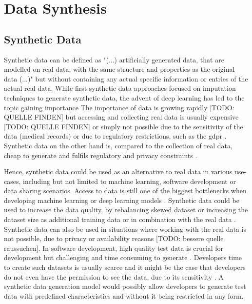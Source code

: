 \section{Data Synthesis}
\label{ch:preliminaries-dataSynthesis}

\subsection{Synthetic Data}
\label{ch:preliminaries-dataSynthesis-syntheticData}
Synthetic data can be defined as "(...) artificially generated data, that are modelled on real data, with the same structure and properties as the original data (...)" \cite[p. 2]{kaloskampis2020SyntheticDataCivil} 
but without containing any actual specific information or entries of the actual real data. 
While first synthetic data approaches \cite{gelman1992InferenceIterativeSimulation} focused on imputation techniques to generate synthetic data, the advent of deep learning has led to the topic gaining importance \cite{kowalczyk2022TaxonomyUseSynthetic, kaloskampis2020SyntheticDataCivil}
The importance of data is growing rapidly [TODO: QUELLE FINDEN] but accessing and collecting real data is usually expensive [TODO: QUELLE FINDEN] or simply not possible due to the sensitivity of the data (\eg medical records) \cite{esteban2017RealvaluedMedicalTimea} or due to regulatory restrictions, such as the \gls{gdpr} \cite{european_commission_regulation_2016}.
Synthetic data on the other hand is, compared to the collection of real data, cheap to generate \cite{leminh2021AirGenGANbasedSynthetica} and fulfils regulatory and privacy constraints \cite{zhao2022CTABGANEnhancingTabular}.

Hence, synthetic data could be used as an alternative to real data in various use-cases,
including but not limited to machine learning, software development or data sharing scenarios.
Access to data is still one of the biggest bottlenecks when developing machine learning or deep learning \glspl{model} \cite{fan2020RelationalDataSynthesisa}.
Synthetic data could be used to increase the data quality, by rebalancing skewed dataset \cite{zhao2022CTABGANEnhancingTabular} 
or increasing the dataset size as additional training data or in combination with the real data \cite{leminh2021AirGenGANbasedSynthetica, kim2021OCTGANNeuralODEbased}.
Synthetic data can also be used in situations where working with the real data is not possible, due to privacy or availability reasons [TODO: bessere quelle raussuchen]\cite{zhao2022CTABGANEnhancingTabular}.
In software development, high quality test data is crucial for development but challenging and time consuming to generate \cite{whiting2008CreatingRealisticScenariobased}.
Developers time to create such datasets is usually scarce and it might be the case that developers do not even have the permission to see the data, due to its sensitivity \cite{whiting2008CreatingRealisticScenariobased}.
A synthetic data generation \gls{model} would possibly allow developers to generate test data with predefined characteristics and without it being restricted in any form.


